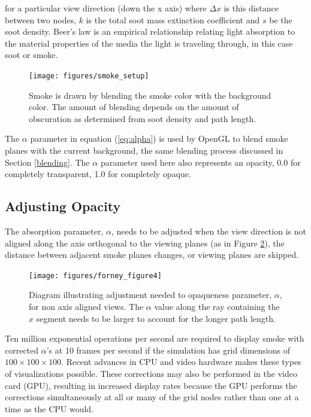 \noindent for a particular view direction (down the x axis) where $\Delta x$
is this distance between two nodes, $k$ is the total soot mass
extinction coefficient and $s$ be the soot density. Beer's law is
an empirical relationship relating light absorption to the
material properties of the media the light is traveling through,
in this case soot or smoke.

\begin{figure}[\figoptions]
\begin{center}
\texttt{[image: figures/smoke\_setup]}
\end{center}
\caption {Smoke is drawn by blending the smoke color with the
background color.  The amount of blending depends on the amount of
obscuration as determined from soot density and path length.}
\label{figsmokesetup}
\end{figure}

The $\alpha$ parameter in equation (\ref{eq:alpha}) is used by OpenGL to blend smoke planes with the current background, the same blending process discussed in Section \ref{blending}.  The $\alpha$ parameter used here also represents an opacity, 0.0 for completely transparent, 1.0 for completely opaque.

%
%

\subsection{Adjusting Opacity}

The absorption parameter, $\alpha$, needs to be adjusted when the
view direction is not aligned along the axis orthogonal to the
viewing planes (as in Figure \ref{figray}), the distance between
adjacent smoke planes changes, or viewing planes are skipped.
\begin{figure}[\figoptions]
\centerline{\texttt{[image: figures/forney\_figure4]}}
\caption [Diagram illustrating the adjustment needed to opaqueness
parameter, $\alpha$, for non axis aligned views.] { Diagram
illustrating adjustment needed to opaqueness parameter, $\alpha$,
for non axis aligned views. The $\alpha$ value along the ray
containing the $\hat{x}$ segment needs to be larger to account for
the longer path length. } \label{figray}
\end{figure}

Ten million exponential operations per second are required to
display smoke with corrected $\alpha$'s at 10 frames per second if
the simulation has grid dimensions of $100\times 100\times 100$.
Recent advances in CPU and video hardware makes these types of
visualizations possible. These corrections may also be performed
in the video card (GPU), resulting in increased display rates
because the GPU performs the corrections simultaneously at all or
many of the grid nodes rather than one at a time as the CPU would.

